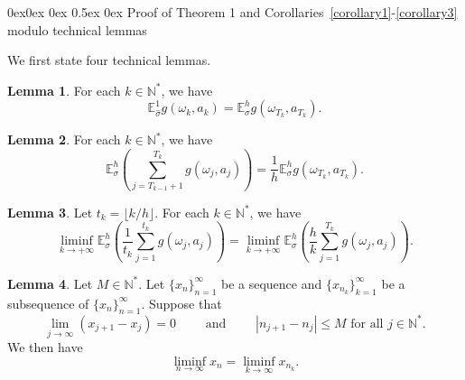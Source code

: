 \documentclass[english,openary,11pt]{article}
\makeatletter
\renewcommand\subsection{\@startsection{subsection}{2}{\z@}%
                                     {0ex\@plus 0ex \@minus 0ex}%
                                     {0.5ex \@plus 0ex}%
                                     {\normalfont\Large\bfseries}}%
\theoremstyle{definition}
\newtheorem{lemma}{Lemma}
\newcommand{\N}{\mathbb{N}}
\newcommand{\E}{\mathbb{E}}
\makeatother
\begin{document}
\subsection{Proof of Theorem 1 and Corollaries~\ref{corollary1}-\ref{corollary3} modulo technical lemmas}

We first state four technical lemmas.

\begin{lemma}
For each $k \in \N^*$, we have
$$\E_{\widehat \sigma}^1 g(\omega_k, a_k) = \E_\sigma^h g(\omega_{T_k}, a_{T_k}).$$
\label{lemma1}
\end{lemma}

\begin{lemma} For each $k \in \N^*$, we have
$$\E_{\sigma}^h \left( \sum_{j = T_{k-1}+1}^{T_k} g(\omega_j, a_j) \right) = \frac 1 h \E_\sigma^h g(\omega_{T_k}, a_{T_k}).$$
\label{lemma3}
\end{lemma}

\begin{lemma}
Let $t_k = \lfloor k/h \rfloor$.
For each $k \in \N^*$, we have
$$
\liminf_{k \to +\infty} \E_{\sigma}^h\left( \frac{1}{t_k} \sum_{j = 1}^{t_k} g(\omega_j, a_j) \right)
=
\liminf_{k \to +\infty} \E_{\sigma}^h\left( \frac{h}{k} \sum_{j = 1}^{T_k} g(\omega_j, a_j) \right).
$$
\label{lemma4}
\end{lemma}

\begin{lemma}
Let $M \in \N^*$. Let $\{x_n\}_{n=1}^\infty$ be a sequence and $\{x_{n_k}\}_{k=1}^\infty$ be a  subsequence of $\{x_n\}_{n=1}^\infty$. Suppose that
$$	\lim_{j \to \infty} (x_{j+1} - x_j) = 0 \qquad \text{ and } \qquad |n_{j+1} - n_j| \le M \text{ for all } j \in \N^*.$$
We then have
$$\liminf_{n \to \infty} x_n = \liminf_{k \to \infty} x_{n_k}.$$
\label{lemma5}
\end{lemma}
\end{document}
